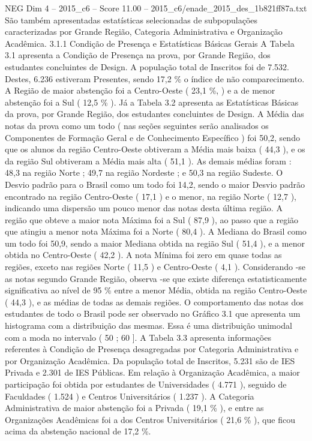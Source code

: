 \begin{textsample}{NEG Dim 4 – 2015\_c6 – Score 11.00 – 2015\_c6/enade\_2015\_des\_1b821ff87a.txt}
São também apresentadas estatísticas selecionadas de subpopulações caracterizadas por Grande Região, Categoria Administrativa e Organização Acadêmica. 3.1.1 Condição de Presença e Estatísticas Básicas Gerais A Tabela 3.1 apresenta a Condição de Presença na prova, por Grande Região, dos estudantes concluintes de Design.
A população total de Inscritos foi de 7.532.
Destes, 6.236 estiveram Presentes, sendo 17,2 \% o índice de não comparecimento.
A Região de maior abstenção foi a Centro-Oeste ( 23,1 \%, ) e a de menor abstenção foi a Sul ( 12,5 \% ).
Já a Tabela 3.2 apresenta as Estatísticas Básicas da prova, por Grande Região, dos estudantes concluintes de Design.
A Média das notas da prova como um todo ( nas seções seguintes serão analisados os Componentes de Formação Geral e de Conhecimento Específico ) foi 50,2, sendo que os alunos da região Centro-Oeste obtiveram a Média mais baixa ( 44,3 ), e os da região Sul obtiveram a Média mais alta ( 51,1 ).
As demais médias foram : 48,3 na região Norte ; 49,7 na região Nordeste ; e 50,3 na região Sudeste.
O Desvio padrão para o Brasil como um todo foi 14,2, sendo o maior Desvio padrão encontrado na região Centro-Oeste ( 17,1 ) e o menor, na região Norte ( 12,7 ), indicando uma dispersão um pouco menor das notas desta última região.
A região que obteve a maior nota Máxima foi a Sul ( 87,9 ), ao passo que a região que atingiu a menor nota Máxima foi a Norte ( 80,4 ).
A Mediana do Brasil como um todo foi 50,9, sendo a maior Mediana obtida na região Sul ( 51,4 ), e a menor obtida no Centro-Oeste ( 42,2 ).
A nota Mínima foi zero em quase todas as regiões, exceto nas regiões Norte ( 11,5 ) e Centro-Oeste ( 4,1 ).
Considerando -se as notas segundo Grande Região, observa -se que existe diferença estatisticamente significativa ao nível de 95 \% entre a menor Média, obtida na região Centro-Oeste ( 44,3 ), e as médias de todas as demais regiões.
O comportamento das notas dos estudantes de todo o Brasil pode ser observado no Gráfico 3.1 que apresenta um histograma com a distribuição das mesmas.
Essa é uma distribuição unimodal com a moda no intervalo ( 50 ; 60 ].
A Tabela 3.3 apresenta informações referentes à Condição de Presença desagregadas por Categoria Administrativa e por Organização Acadêmica.
Da população total de Inscritos, 5.231 são de IES Privada e 2.301 de IES Públicas.
Em relação à Organização Acadêmica, a maior participação foi obtida por estudantes de Universidades ( 4.771 ), seguido de Faculdades ( 1.524 ) e Centros Universitários ( 1.237 ).
A Categoria Administrativa de maior abstenção foi a Privada ( 19,1 \% ), e entre as Organizações Acadêmicas foi a dos Centros Universitários ( 21,6 \% ), que ficou acima da abstenção nacional de 17,2 \%.

\end{textsample}
